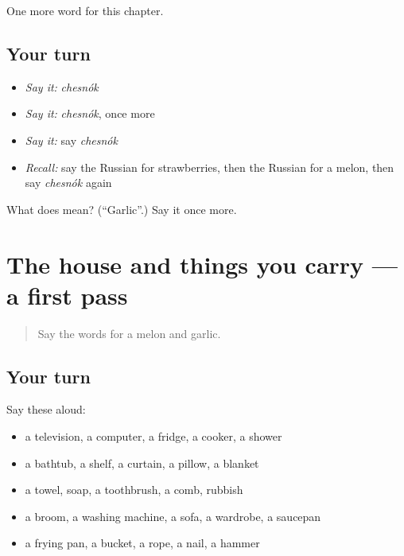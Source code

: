 \begin{grammarlens}[title={What you've built}]
One more word for this chapter.
\end{grammarlens}

\subsection*{Your turn}
\begin{itemize}
\raggedright
  \item \emph{Say it:} \emph{chesnók}
  \item \emph{Say it:} \emph{chesnók}, once more
  \item \emph{Say it:} say \emph{chesnók}
  \item \emph{Recall:} say the Russian for strawberries, then the Russian for a melon, then say \emph{chesnók} again
\end{itemize}

\begin{tcolorbox}[breakable,colback=teal!4,colframe=teal!35!black,title={Before you move on}]
What does  mean? (\textquotedblleft{}Garlic\textquotedblright{}.) Say it once more.
\end{tcolorbox}
\section[(dialogue)]{The house and things you carry — a first pass}

\label{lesson:RU-R104-first-pass-the-house-and-things-you-carry}



\begin{quote}
Say the words for a melon and garlic.
\end{quote}

\subsection*{Your turn}
Say these aloud:

\begin{itemize}
\raggedright
  \item a television, a computer, a fridge, a cooker, a shower
  \item a bathtub, a shelf, a curtain, a pillow, a blanket
  \item a towel, soap, a toothbrush, a comb, rubbish
  \item a broom, a washing machine, a sofa, a wardrobe, a saucepan
  \item a frying pan, a bucket, a rope, a nail, a hammer
\end{itemize}

